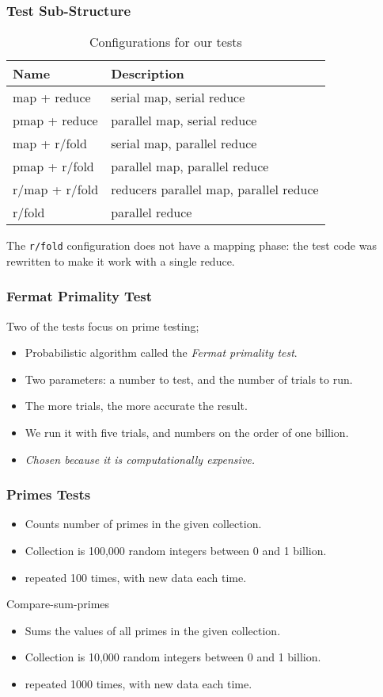 \documentclass{beamer}
\newcommand{\clocode}[1]{{\texttt {#1}}}
\begin{document}
\begin{frame}
\frametitle{Test Sub-Structure}
\begin{table}
\begin{center}
\begin{tabular}{|l|l|}
\hline 
Name & Description \\
\hline
map + reduce & serial map, serial reduce \\
pmap + reduce & parallel map, serial reduce \\
map + r/fold & serial map, parallel reduce \\
pmap + r/fold & parallel map, parallel reduce\\
r/map + r/fold & reducers parallel map, parallel reduce\\
r/fold & parallel reduce\\
\hline
\end{tabular}
\end{center}
\caption{Configurations for our tests}\label{table:tests}
\end{table}
The \clocode{r/fold} configuration does not have a mapping phase: the test code was rewritten to make it work with a single reduce.
\end{frame}
\begin{frame}
\frametitle{Fermat Primality Test}
Two of the tests focus on prime testing;
	\begin{itemize}
	\item  Probabilistic algorithm called the \emph{Fermat primality test}.
	\item Two parameters: a number to test, and the number of trials to run.
	\item The more trials, the more accurate the result.
	\item We run it with five trials, and numbers on the order of one billion.
	\item \emph{Chosen because it is computationally expensive.}
	\end{itemize}
\end{frame}

\begin{frame}
\frametitle{Primes Tests}
	\begin{itemize}
	\item Counts number of primes in the given collection.
	\item Collection is 100,000 random integers between 0 and 1 billion.
	\item repeated 100 times, with new data each time. 
	\end{itemize}
Compare-sum-primes
	\begin{itemize}
	\item Sums the values of all primes in the given collection.
	\item Collection is 10,000 random integers  between 0 and 1 billion.
	\item repeated 1000 times, with new data each time. 
	\end{itemize}
\end{frame}
\end{document}
